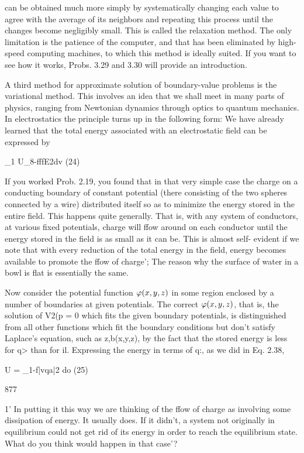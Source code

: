  

can be obtained much more simply by systematically changing each
value to agree with the average of its neighbors and repeating this
process until the changes become negligibly small. This is called
the relaxation method. The only limitation is the patience of the
computer, and that has been eliminated by high-speed computing
machines, to which this method is ideally suited. If you want to see
how it works, Probs. 3.29 and 3.30 will provide an introduction.

A third method for approximate solution of boundary-value problems
is the variational method. This involves an idea that we shall
meet in many parts of physics, ranging from Newtonian dynamics
through optics to quantum mechanics. In electrostatics the principle
turns up in the following form: We have already learned that
the total energy associated with an electrostatic field can be expressed
by

_1
U_8-fffE2dv (24)

If you worked Prob. 2.19, you found that in that very simple case
the charge on a conducting boundary of constant potential (there
consisting of the two spheres connected by a wire) distributed itself
so as to minimize the energy stored in the entire field. This happens
quite generally. That is, with any system of conductors, at various
fixed potentials, charge will ffow around on each conductor until the
energy stored in the field is as small as it can be. This is almost self-
evident if we note that with every reduction of the total energy in
the field, energy becomes available to promote the ffow of charge';
The reason why the surface of water in a bowl is flat is essentially
the same.

Now consider the potential function $\varphi(x,y,z)$ in some region enclosed
by a number of boundaries at given potentials. The correct
$\varphi(x,y,z)$, that is, the solution of V2(p = 0 which fits the given boundary
potentials, is distinguished from all other functions which fit the
boundary conditions but don't satisfy Laplace's equation, such as
z,b(x,y,z), by the fact that the stored energy is less for q> than for il.
Expressing the energy in terms of q:, as we did in Eq. 2.38,

U = _1-f|vqa|2 do (25)

877

1' In putting it this way we are thinking of the ffow of charge as involving some dissipation
of energy. It usually does. If it didn't, a system not originally in equilibrium could
not get rid of its energy in order to reach the equilibrium state. What do you think would
happen in that case'?


